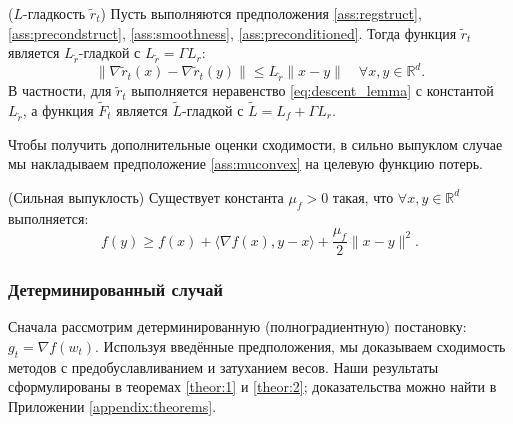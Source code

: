\begin{lemma}\label{lemma:tildesmoothness}{($L$-гладкость $\widetilde{r}_t$)}
Пусть выполняются предположения \ref{ass:regstruct}, \ref{ass:precondstruct}, \ref{ass:smoothness}, \ref{ass:preconditioned}. Тогда функция $\widetilde{r}_t$ является $L_{\tilde{r}}$-гладкой с $L_{\tilde{r}} = \Gamma L_r$:
\begin{equation*}
    		\|\nabla \widetilde{r}_t(x) - \nabla \widetilde{r}_t(y)\| \leq L_{\tilde{r}} \|x - y\| \quad \forall x, y \in \mathbb{R}^d.
\end{equation*}
В частности, для $\widetilde{r}_t$ выполняется неравенство \eqref{eq:descent_lemma} с константой $L_{\tilde r}$, а функция $\widetilde{F}_t$ является $\widetilde{L}$-гладкой с $\widetilde{L} = L_f + \Gamma L_r$.
\end{lemma}

Чтобы получить дополнительные оценки сходимости, в сильно выпуклом случае мы накладываем предположение \ref{ass:muconvex} на целевую функцию потерь.
\begin{assumption}{(Сильная выпуклость)}
    \label{ass:muconvex}
    Существует константа $\mu_f > 0$ такая, что $\forall x, y \in \mathbb{R}^d$ выполняется:
    $$
    f(y) \geq f(x) + \langle \nabla f(x), y-x \rangle + \frac{\mu_f}{2} \|x-y\|^2.
    $$
\end{assumption}

\subsubsection{Детерминированный случай}

Сначала рассмотрим детерминированную (полноградиентную) постановку: $g_t = \nabla f(w_t)$. Используя введённые предположения, мы доказываем сходимость методов с предобуславливанием и затуханием весов. Наши результаты сформулированы в теоремах \ref{theor:1} и \ref{theor:2}; доказательства можно найти в Приложении \ref{appendix:theorems}.

